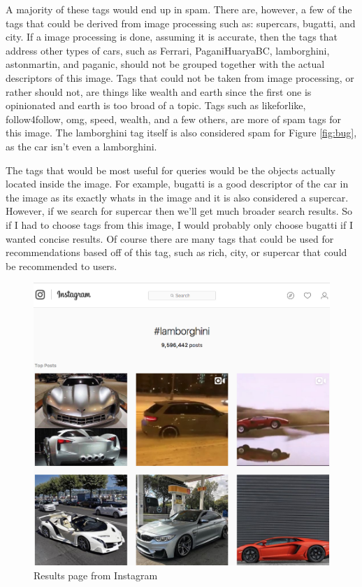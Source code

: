 \documentclass[letterpaper,11pt]{article}
\begin{document}
A majority of these tags would end up in spam.
There are, however, a few of the tags that could be derived from image processing such as: 
supercars, bugatti, and city.
If a image processing is done, assuming it is accurate, then the tags that address other types of cars, such as Ferrari, PaganiHuaryaBC, lamborghini, astonmartin, and paganic, should not be grouped together with the actual descriptors of this image.
Tags that could not be taken from image processing, or rather should not, are things like wealth and earth since the first one is opinionated and earth is too broad of a topic.
Tags such as likeforlike, follow4follow, omg, speed, wealth, and a few others, are more of spam tags for this image. 
The lamborghini tag itself is also considered spam for Figure \ref{fig:bug}, as the car isn't even a lamborghini.

The tags that would be most useful for queries would be the objects actually located inside the image.
For example, bugatti is a good descriptor of the car in the image as its exactly whats in the image and it is also considered a supercar.
However, if we search for supercar then we'll get much broader search results.
So if I had to choose tags from this image, I would probably only choose bugatti if I wanted concise results.
Of course there are many tags that could be used for recommendations based off of this tag, such as rich, city, or supercar that could be recommended to users. 


\begin{figure}[h]
\centering
\includegraphics[scale=0.4]{insta_results.png}
\caption{Results page from Instagram}
\label{fig:insta_results}
\end{figure}
\end{document}
